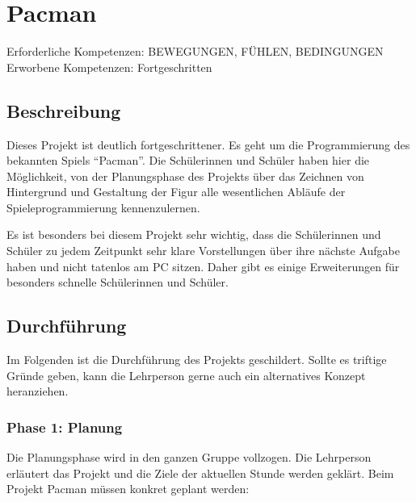 \section{Pacman}\label{pacman}

Erforderliche Kompetenzen: BEWEGUNGEN, FÜHLEN, BEDINGUNGEN\\
Erworbene Kompetenzen: Fortgeschritten

\begin{figure}[ht]
    \centering 
    \caption[\Sectionname]{\Sectionname}
\end{figure}

\subsection{Beschreibung}\label{beschreibung}

Dieses Projekt ist deutlich fortgeschrittener. Es geht um die
Programmierung des bekannten Spiels ``Pacman''. Die Schülerinnen und
Schüler haben hier die Möglichkeit, von der Planungsphase des Projekts
über das Zeichnen von Hintergrund und Gestaltung der Figur alle
wesentlichen Abläufe der Spieleprogrammierung kennenzulernen.

Es ist besonders bei diesem Projekt sehr wichtig, dass die Schülerinnen
und Schüler zu jedem Zeitpunkt sehr klare Vorstellungen über ihre
nächste Aufgabe haben und nicht tatenlos am PC sitzen. Daher gibt es
einige Erweiterungen für besonders schnelle Schülerinnen und Schüler.

\subsection{Durchführung}\label{durchfuxfchrung}

Im Folgenden ist die Durchführung des Projekts geschildert. Sollte es
triftige Gründe geben, kann die Lehrperson gerne auch ein alternatives
Konzept heranziehen.

\subsubsection{Phase 1: Planung}\label{phase-1-planung}

Die Planungsphase wird in den ganzen Gruppe vollzogen. Die Lehrperson
erläutert das Projekt und die Ziele der aktuellen Stunde werden geklärt.
Beim Projekt Pacman müssen konkret geplant werden:

